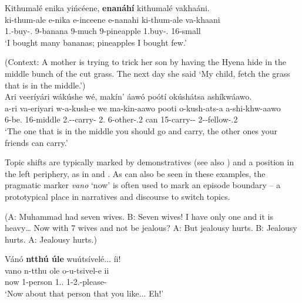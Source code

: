 \documentclass[output=paper]{langscibook}
\begin{document}
\ea
\label{bkm:Ref96973064}
Kithumalé enika yińcéene, \textbf{enanáhí} kithumalé vakhaáni.\\
\gll
ki-thum-ale  e-nika  e-inceene  e-nanahi  ki-thum-ale  va-khaani\\
1\SG{}.\SM{}-buy-\PFV{}.\CJ{}  9-banana  9-much  9-pineapple  1\SG{}.buy-\PFV{}.\CJ{}  16-small\\
\glt
‘I bought many bananas; pineapples I bought few.’\\


\z

\ea
\label{bkm:Ref110322922}
(Context: A mother is trying to trick her son by having the Hyena hide in the middle bunch of the cut grass. The next day she said ‘My child, fetch the grass that is in the middle.’)\\
Ari veeríyári wákúshe wé, makín’ áawó poótí okúshátsa ashíkwáawo.\\
\gll
a-ri  va-eriyari  w-a-kush-e  we  ma-kin-aawo  pooti  o-kush-ats-a  a-shi-khw-aawo  \\
6-be.\REL{}  16-middle  2\SG{}.\SM{}-\SUBS{}-carry-\SBJV{}  2\SG{}.\PRO{}  6-other-\POSS{}.2\SG{}  can  15-carry-\PLUR{}-\FV{}  2-\DIM{}-fellow-\POSS{}.2\SG{} \\
\glt
‘The one that is in the middle you should go and carry, the other ones your friends can carry.’\\

\z

Topic shifts are typically marked by demonstratives (see also ) and a position in the left periphery, as in  and . As can also be seen in these examples, the pragmatic marker \textit{vano} ‘now’ is often used to mark an episode boundary – a prototypical place in narratives and discourse to switch topics.

\ea
(A: Muhammad had seven wives. B: Seven wives! I have only one and it is heavy… Now with 7 wives and not be jealous? A: But jealousy hurts. B: Jealousy hurts. A: Jealousy hurts.)\\
\begin{xlist}
\label{bkm:Ref96973972}
Vánó \textbf{ntthú úle} wuútsívelé... íi!\\
\gll
vano  n-tthu  ole  o-u-tsivel-e  ii\\
now  1-person  1.\DEM{}.\DIST{}  1\SM{}-2\SG{}.\OM{}-please-\SBJV{}  \EXCLAM{}\\
\glt
‘Now about that person that you like... Eh!’\\

\end{xlist}
\end{document}
